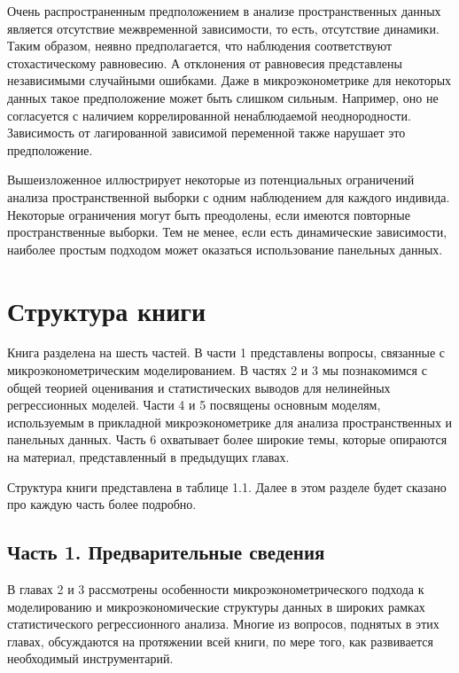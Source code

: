 Очень распространенным предположением в анализе пространственных данных является отсутствие межвременной зависимости, то есть, отсутствие динамики. Таким образом, неявно предполагается, что наблюдения соответствуют стохастическому равновесию. А отклонения от равновесия представлены  независимыми случайными ошибками. Даже в микроэконометрике для некоторых данных такое предположение может быть слишком сильным. Например, оно не согласуется с наличием коррелированной ненаблюдаемой неоднородности. Зависимость от лагированной зависимой переменной также нарушает это предположение.

Вышеизложенное иллюстрирует некоторые из потенциальных ограничений анализа пространственной выборки с одним наблюдением для каждого индивида. Некоторые ограничения могут быть преодолены, если имеются повторные пространственные выборки. Тем не менее, если есть динамические зависимости, наиболее простым подходом может оказаться использование панельных данных.

\section{Структура книги}
 
Книга разделена на шесть частей. В части 1 представлены вопросы, связанные с микроэконометрическим моделированием. В частях 2 и 3 мы познакомимся с общей теорией оценивания и статистических выводов для нелинейных регрессионных моделей. Части 4 и 5 посвящены основным моделям, используемым в прикладной микроэконометрике для анализа пространственных и панельных данных. Часть 6 охватывает более широкие темы, которые опираются на материал, представленный в предыдущих главах.

Структура книги представлена в таблице 1.1. Далее в этом разделе будет сказано про каждую часть более подробно.
	
\subsection{Часть 1. Предварительные сведения}

В главах 2 и 3 рассмотрены  особенности микроэконометрического подхода к моделированию и микроэкономические структуры данных в широких рамках  статистического регрессионного анализа. Многие из вопросов, поднятых в этих главах, обсуждаются на протяжении всей книги, по мере того, как развивается необходимый инструментарий.

